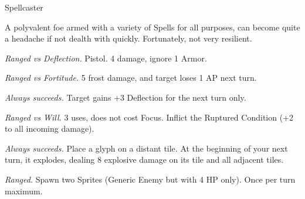\begin{monsterboxbg}{Spellcaster}

    A polyvalent foe armed with a variety of Spells for all purposes, can become quite a headache if not dealth with quickly. Fortunately, not very resilient.
    
    \rpghline
    \stats[
        STR = \stat{10}, 
        DEX = \stat{8},
        CON = \stat{10},
        INT = \stat{14},
        WIS = \stat{14},
        CHA = \stat{12},
    ]
    \rpghline

    \basics[
    armorclass = 0,
    hitpoints  = 18,
    focus      = 6,
    defenses   = {Deflection 1, Reflex 1, Fortitude 0, Will 3}
    ]
    \rpghline

    \details[%
    skills = {Kosmics 2, Lore 2},
    accuracies = {Melee -2, Ranged 4},
    ]
    \rpghline%
    

    \begin{rpg-monsteraction}
        \textit{Ranged vs Deflection.} Pistol. 4 damage, ignore 1 Armor.
    \end{rpg-monsteraction}

    \begin{rpg-monsteraction}[Frostbite]
        \textit{Ranged vs Fortitude.} 5 frost damage, and target loses 1 AP next turn.
    \end{rpg-monsteraction}

    
    \begin{rpg-monsteraction}[Toughen]
        \textit{Always succeeds.} Target gains +3 Deflection for the next turn only.
    \end{rpg-monsteraction}

    
    \begin{rpg-monsteraction}
        \textit{Ranged vs Will.} 3 uses, does not cost Focus. Inflict the Ruptured Condition (+2 to all incoming damage).
    \end{rpg-monsteraction}

    
    \begin{rpg-monsteraction}
        \textit{Always succeeds.} Place a glyph on a distant tile. At the beginning of your next turn, it explodes, dealing 8 explosive damage on its tile and all adjacent tiles.
    \end{rpg-monsteraction}
    
    \begin{rpg-monsteraction}
        \textit{Ranged.} Spawn two Sprites (Generic Enemy but with 4 HP only). Once per turn maximum.
    \end{rpg-monsteraction}


\end{monsterboxbg}
	





